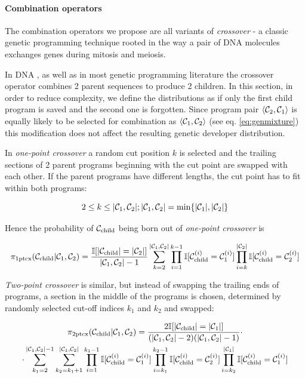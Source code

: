 \paragraph{Combination operators}

The combination operators we propose are all variants of \emph{crossover} - a classic genetic programming technique rooted in the way a pair of DNA molecules exchanges genes during mitosis and meiosis.

In DNA \cite{evocritique}, as well as in most genetic programming literature \cite{genprog1,genprog2} the crossover operator combines 2 parent sequences to produce 2 children.
In this section, in order to reduce complexity, we define the distributions as if only the first child program is saved and the second one is forgotten.
Since program pair $\langle \mathcal{C}_2, \mathcal{C}_1 \rangle$ is equally likely to be selected for combination as $\langle \mathcal{C}_1, \mathcal{C}_2 \rangle$ (see eq. \ref{eq:genmixture}) this modification does not affect the resulting genetic developer distribution.

In \emph{one-point crossover} a random cut position $k$ is selected and the trailing sections of 2 parent programs beginning with the cut point are swapped with each other. 
If the parent programs have different lengths, the cut point has to fit within both programs:

\begin{equation}
    2 \leq k \leq |\mathcal{C}_1,\mathcal{C}_2|; |\mathcal{C}_1,\mathcal{C}_2| = \min\{|\mathcal{C}_1|, |\mathcal{C}_2|\}
\end{equation}

Hence the probability of $\mathcal{C}_\text{child}$ being born out of \emph{one-point crossover} is

\begin{equation}
    \pi_\text{1ptcx}(\mathcal{C}_\text{child}|\mathcal{C}_1,\mathcal{C}_2) =
        \frac{\mathbb{I} [|\mathcal{C}_\text{child}|=|\mathcal{C}_2|]}{|\mathcal{C}_1,\mathcal{C}_2|-1}
        \sum\limits_{k=2}^{|\mathcal{C}_1,\mathcal{C}_2|} \prod\limits_{i=1}^{k-1} \mathbb{I} [\mathcal{C}_\text{child}^{(i)} = \mathcal{C}_1^{(i)}] \prod\limits_{i=k}^{|\mathcal{C}_2|} \mathbb{I} [\mathcal{C}_\text{child}^{(i)} = \mathcal{C}_2^{(i)}]
\end{equation}

\emph{Two-point crossover} is similar, but instead of swapping the trailing ends of programs, a section in the middle of the programs is chosen, determined by randomly selected cut-off indices $k_1$ and $k_2$ and swapped:

\begin{multline}
    \pi_\text{2ptcx}(\mathcal{C}_\text{child}|\mathcal{C}_1,\mathcal{C}_2) =
        \frac{2 \mathbb{I} [|\mathcal{C}_\text{child}|=|\mathcal{C}_1|]}{(|\mathcal{C}_1,\mathcal{C}_2|-2)(|\mathcal{C}_1,\mathcal{C}_2|-1)} 
        \cdot \\ \cdot
        \sum\limits_{k_1=2}^{|\mathcal{C}_1,\mathcal{C}_2|-1}
        \sum\limits_{k_2=k_1+1}^{|\mathcal{C}_1,\mathcal{C}_2|} 
        \prod\limits_{i=1}^{k_1-1} \mathbb{I} [\mathcal{C}_\text{child}^{(i)} = \mathcal{C}_1^{(i)}] \prod\limits_{i=k_1}^{k_2-1} \mathbb{I} [\mathcal{C}_\text{child}^{(i)} = \mathcal{C}_2^{(i)}]
        \prod\limits_{i=k_2}^{|\mathcal{C}_1|} \mathbb{I} [\mathcal{C}_\text{child}^{(i)} = \mathcal{C}_1^{(i)}]
\end{multline}

